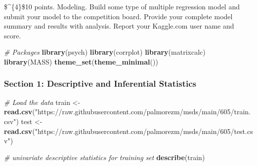 \documentclass[
]{article}
\newenvironment{Shaded}{\begin{snugshade}}{\end{snugshade}}
\newcommand{\CommentTok}[1]{\textcolor[rgb]{0.56,0.35,0.01}{\textit{#1}}}
\newcommand{\KeywordTok}[1]{\textcolor[rgb]{0.13,0.29,0.53}{\textbf{#1}}}
\newcommand{\NormalTok}[1]{#1}
\newcommand{\StringTok}[1]{\textcolor[rgb]{0.31,0.60,0.02}{#1}}
\begin{document}
\$\^{}\{4\}\$10 points. Modeling. Build some type of multiple regression
model and submit your model to the competition board. Provide your
complete model summary and results with analysis. Report your Kaggle.com
user name and score.

\begin{Shaded}
\begin{Highlighting}[]
\CommentTok{# Packages}
\KeywordTok{library}\NormalTok{(psych)}
\KeywordTok{library}\NormalTok{(corrplot)}
\KeywordTok{library}\NormalTok{(matrixcalc)}
\KeywordTok{library}\NormalTok{(MASS)}
\KeywordTok{theme_set}\NormalTok{(}\KeywordTok{theme_minimal}\NormalTok{())}
\end{Highlighting}
\end{Shaded}

\hypertarget{section-1-descriptive-and-inferential-statistics}{%
\subsubsection{Section 1: Descriptive and Inferential
Statistics}\label{section-1-descriptive-and-inferential-statistics}}

\begin{Shaded}
\begin{Highlighting}[]
\CommentTok{# Load the data}
\NormalTok{train <-}\StringTok{ }\KeywordTok{read.csv}\NormalTok{(}\StringTok{"https://raw.githubusercontent.com/palmorezm/msds/main/605/train.csv"}\NormalTok{)}
\NormalTok{test <-}\StringTok{ }\KeywordTok{read.csv}\NormalTok{(}\StringTok{"https://raw.githubusercontent.com/palmorezm/msds/main/605/test.csv"}\NormalTok{)}
\end{Highlighting}
\end{Shaded}

\begin{Shaded}
\begin{Highlighting}[]
\CommentTok{# univariate descriptive statistics for training set}
\KeywordTok{describe}\NormalTok{(train)}
\end{Highlighting}
\end{Shaded}
\end{document}
